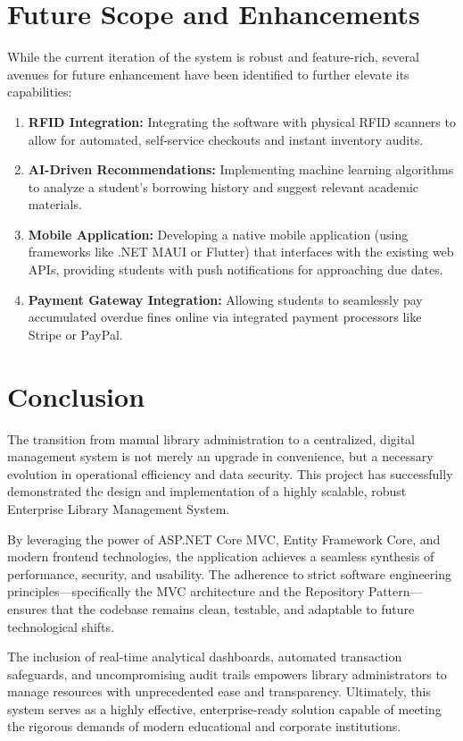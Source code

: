 \documentclass[conference]{IEEEtran}
\begin{document}
\section{Future Scope and Enhancements}
While the current iteration of the system is robust and feature-rich, several avenues for future enhancement have been identified to further elevate its capabilities:
\begin{enumerate}
    \item \textbf{RFID Integration:} Integrating the software with physical RFID scanners to allow for automated, self-service checkouts and instant inventory audits.
    \item \textbf{AI-Driven Recommendations:} Implementing machine learning algorithms to analyze a student's borrowing history and suggest relevant academic materials.
    \item \textbf{Mobile Application:} Developing a native mobile application (using frameworks like .NET MAUI or Flutter) that interfaces with the existing web APIs, providing students with push notifications for approaching due dates.
    \item \textbf{Payment Gateway Integration:} Allowing students to seamlessly pay accumulated overdue fines online via integrated payment processors like Stripe or PayPal.
\end{enumerate}

\section{Conclusion}
The transition from manual library administration to a centralized, digital management system is not merely an upgrade in convenience, but a necessary evolution in operational efficiency and data security. This project has successfully demonstrated the design and implementation of a highly scalable, robust Enterprise Library Management System. 

By leveraging the power of ASP.NET Core MVC, Entity Framework Core, and modern frontend technologies, the application achieves a seamless synthesis of performance, security, and usability. The adherence to strict software engineering principles—specifically the MVC architecture and the Repository Pattern—ensures that the codebase remains clean, testable, and adaptable to future technological shifts. 

The inclusion of real-time analytical dashboards, automated transaction safeguards, and uncompromising audit trails empowers library administrators to manage resources with unprecedented ease and transparency. Ultimately, this system serves as a highly effective, enterprise-ready solution capable of meeting the rigorous demands of modern educational and corporate institutions.
\end{document}
